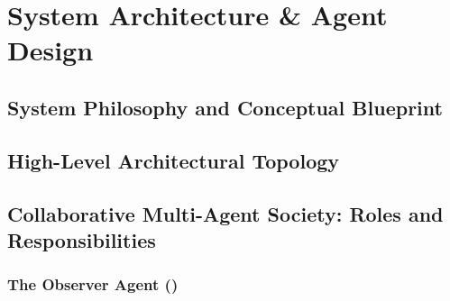 \chapter{System Architecture \& Agent Design}
\label{chap:system_architecture}

\section{System Philosophy and Conceptual Blueprint}
\label{sec:arch_philosophy}

\section{High-Level Architectural Topology}
\label{sec:arch_topology}

\section{Collaborative Multi-Agent Society: Roles and Responsibilities}
\label{sec:arch_agent_roles}

\subsection{The Observer Agent (\agentObserver)}

